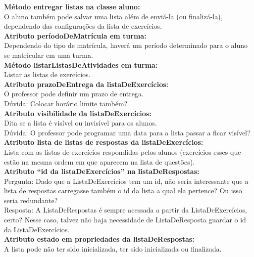 \documentclass[12pt,letterpaper]{article}
\begin{document}
\textbf{Método entregar listas na classe aluno:}\\
O aluno também pode salvar uma lista além de enviá-la (ou finalizá-la), dependendo das configurações da lista de exercícios.\\

\textbf{Atributo períodoDeMatrícula em turma:}\\
Dependendo do tipo de matrícula, haverá um período determinado para o aluno se matricular em uma turma.\\

\textbf{Método listarListasDeAtividades em turma:}\\
Listar as listas de exercícios.\\

\textbf{Atributo prazoDeEntrega da listaDeExercícios:}\\
O professor pode definir um prazo de entrega.\\
Dúvida: Colocar horário limite também?\\

\textbf{Atributo visibilidade da listaDeExercícios:}\\
Dita se a lista é visível ou invisível para os alunos.\\
Dúvida: O professor pode programar uma data para a lista passar a ficar visível?\\

\textbf{Atributo lista de listas de respostas da listaDeExercícios:}\\
Lista com as listas de exercícios respondidas pelos alunos (exercícios esses que estão na mesma ordem em que aparecem na lista de questões).\\

\textbf{Atributo “id da listaDeExercícios” na listaDeRespostas: }\\
Pergunta: Dado que a ListaDeExercicios tem um id, não seria interessante que a lista de respostas carregasse também o id da lista a qual ela pertence? Ou isso seria redundante?\\
Resposta: A ListaDeRespostas é sempre acessada a partir da ListaDeExercícios, certo? Nesse caso, talvez não haja necessidade de ListaDeResposta guardar o id da ListaDeExercícios.\\

\textbf{Atributo estado em propriedades da listaDeRespostas:}\\
A lista pode não ter sido inicializada, ter sido inicializada ou finalizada.\\
\end{document}
